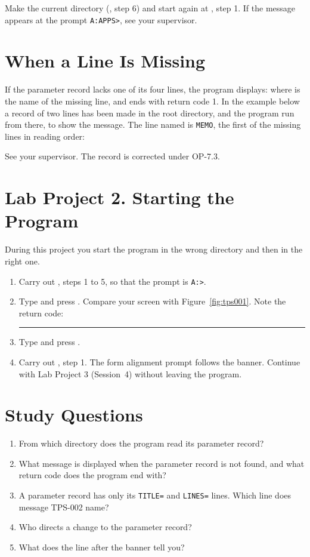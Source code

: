 Make  the current directory (,
step 6) and start again at , step 1.  If the message appears at the
prompt \texttt{A:\bs APPS>}, see your supervisor.

\section{When a Line Is Missing}
If the parameter record lacks one of its four lines, the program displays:
where  is the name of the missing line, and ends with return code 1.
In the example below a record of two lines has been made in the root
directory, and the program run from there, to show the message.  The line
named is \texttt{MEMO}, the first of the missing lines in reading order:


See your supervisor.  The record is corrected under OP-7.3.

\section{Lab Project 2. Starting the Program}
During this project you start the program in the wrong directory and then
in the right one.
\begin{enumerate}
\item Carry out , steps 1 to 5, so that the prompt is
  \texttt{A:\bs>}.
\item Type  and press .  Compare
  your screen with Figure~\ref{fig:tps001}.  Note the return code:
  \rule{20mm}{0.4pt}
\item Type  and press .
\item Carry out , step 1.  The form alignment prompt follows the
  banner.  Continue with Lab Project 3 (Session~4) without leaving the
  program.
\end{enumerate}

\section{Study Questions}
\begin{enumerate}
\item From which directory does the program read its parameter record?
\item What message is displayed when the parameter record is not found, and
  what return code does the program end with?
\item A parameter record has only its \texttt{TITLE=} and \texttt{LINES=}
  lines.  Which line does message TPS-002 name?
\item Who directs a change to the parameter record?
\item What does the line after the banner tell you?
\end{enumerate}
